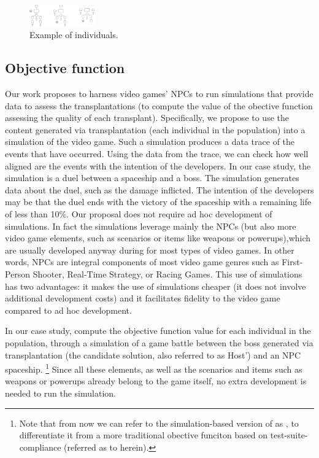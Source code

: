 \begin{figure}[tb]
    \centering
    \includegraphics[width=0.25\textwidth]{Figures/candidates.png}
    \caption{Example of individuals.}
    \label{fig:candidates}
\end{figure}

\subsection{Objective function}

Our work proposes to harness video games' NPCs to run simulations that provide data to assess the transplantations (\ie to compute the value of the obective function assessing the quality of each transplant). 
Specifically, we propose to use the content generated via transplantation (each individual in the population) into a simulation of the video game. Such a simulation produces a data trace of the events that have occurred. Using the data from the trace, we can check how well aligned are the events with the intention of the developers. In our case study, the simulation is a duel between a spaceship and a boss. The simulation generates data about the duel, such as the damage inflicted. The intention of the developers may be that the duel ends with the victory of the spaceship with a remaining life of less than 10\%. Our proposal does not require ad hoc development of simulations. In fact the simulations leverage mainly the NPCs (but also more video game elements, such as scenarios or items like weapons or powerups),which are usually developed anyway during for most types of video games. In other words, NPCs are integral components of  most video game genres such as First-Person Shooter, Real-Time Strategy, or Racing Games. This use of simulations has two advantages:  it makes the use of simulations cheaper (\ie it does not involve additional development costs) and it facilitates fidelity to the video game compared to ad hoc development. 

In our case study, \ApproachName{} compute the objective function value for each individual in the population, through a simulation of a game battle between the boss generated via transplantation (\ie the candidate solution, also referred to as Host') and an NPC spaceship. \footnote{Note that from now we can refer to the simulation-based version of \ApproachName as  \simhotep{}, to differentiate it from a more traditional obective funciton based on test-suite-compliance (referred as to \timhotep herein).} Since all these elements, as well as the scenarios and items such as weapons or powerups already belong to the game itself, no extra development is needed to run the simulation.

